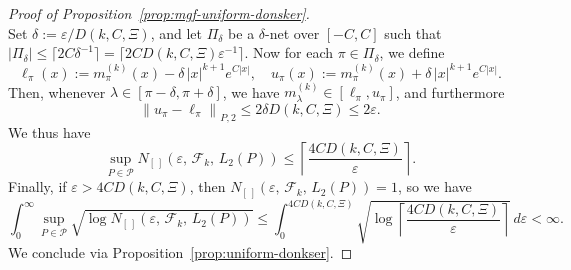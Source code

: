 \documentclass{article}
\theoremstyle{definition}
\newcommand*\eps{\epsilon}
\renewcommand*\epsilon{\varepsilon}
\newcommand{\1}{\mathbbm{1}}
\begin{document}
\begin{proof}[Proof of Proposition~\ref{prop:mgf-uniform-donsker}]
\[\]
Set $\delta := \eps/D(k, C, \Xi)$, and let $\Pi_\delta$ be a $\delta$-net over $[-C, C]$ such that $|\Pi_\delta| \leq \lceil2C\delta^{-1}\rceil = \lceil2CD(k, C, \Xi)\eps^{-1}\rceil$. Now for each $\pi \in \Pi_\delta$, we define 
\[
\ell_\pi (x) := m^{(k)}_\pi(x) - \delta\,|x|^{k+1}e^{C|x|} , \quad u_{\pi}(x) := m^{(k)}_\pi(x) + \delta\,|x|^{k+1}e^{C|x|}.
\]
Then, whenever $\lambda \in [\pi - \delta, \pi + \delta]$, we have $m_\lambda^{(k)} \in [\ell_\pi, u_\pi]$, and furthermore 
\[
\left\|u_\pi - \ell_\pi\right\|_{P, 2} \leq 2\delta D(k, C, \Xi) \leq 2\eps.
\]
We thus have 
\[
\sup_{P \in \mathcal P}N_{[\,]}\!\left(\eps,\, \mathcal F_k,\, L_2(P)\right) 
    \leq
    \left\lceil \frac{4C D(k,C,\Xi)}{\eps} \right\rceil.
\]
Finally, if $\eps > 4CD(k, C, \Xi)$, then $N_{[\,]}\!\left(\eps,\, \mathcal F_k,\, L_2(P)\right)  = 1$, so we have 
\[
\int_0^\infty \sup_{P \in \mathcal P} \sqrt{\log N_{[\,]}\!\left(\eps,\, \mathcal F_k,\, L_2(P)\right)} \leq \int_0^{4CD(k, C, \Xi)} \sqrt{\log \left\lceil \frac{4C D(k,C,\Xi)}{\eps} \right\rceil}\, d\eps < \infty.
\]
We conclude via Proposition~\ref{prop:uniform-donkser}.
\end{proof}
\end{document}
